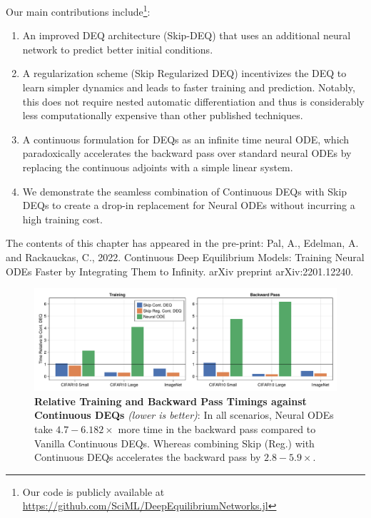 Our main contributions include\footnote{Our code is publicly available at \url{https://github.com/SciML/DeepEquilibriumNetworks.jl}}:
%
\begin{enumerate}
    \item An improved DEQ architecture (Skip-DEQ) that uses an additional neural network to predict better initial conditions.

    \item A regularization scheme (Skip Regularized DEQ) incentivizes the DEQ to learn simpler dynamics and leads to faster training and prediction. Notably, this does not require nested automatic differentiation and thus is considerably less computationally expensive than other published techniques.

    \item A continuous formulation for DEQs as an infinite time neural ODE, which paradoxically accelerates the backward pass over standard neural ODEs by replacing the continuous adjoints with a simple linear system.

    \item We demonstrate the seamless combination of Continuous DEQs with Skip DEQs to create a drop-in replacement for Neural ODEs without incurring a high training cost.
\end{enumerate}
%

The contents of this chapter has appeared in the pre-print: Pal, A., Edelman, A. and Rackauckas, C., 2022. Continuous Deep Equilibrium Models: Training Neural ODEs Faster by Integrating Them to Infinity. arXiv preprint arXiv:2201.12240.~\citep{pal2022mixing}

\begin{figure}
    \centering
    \includegraphics[width=\linewidth]{../figures/deep_equilibrium_models/summary_plot.pdf}
    \caption{\textbf{Relative Training and Backward Pass Timings against Continuous DEQs} \textit{(lower is better)}: In all scenarios, Neural ODEs take $\mathit{4.7} - \mathit{6.182 \times}$ more time in the backward pass compared to Vanilla Continuous DEQs. Whereas combining Skip (Reg.) with Continuous DEQs accelerates the backward pass by $\mathit{2.8} - \mathit{5.9 \times}$.}
    \label{fig:summary_plot}
\end{figure}

